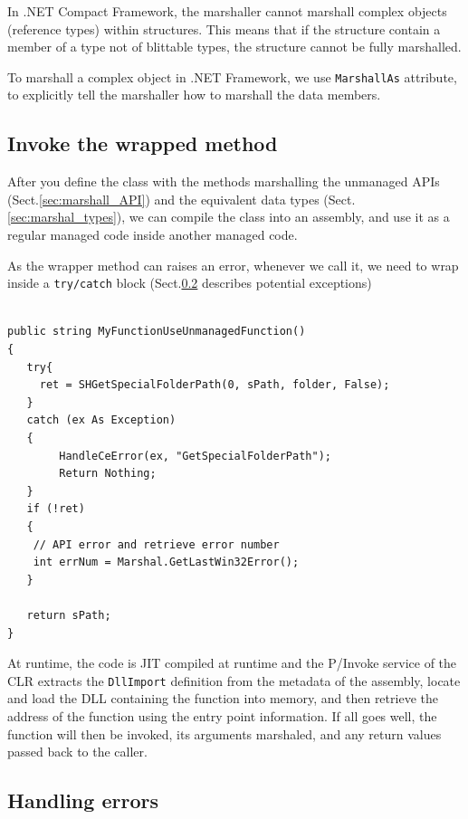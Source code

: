 \begin{mdframed}
In .NET Compact Framework, the marshaller cannot marshall complex objects
(reference types) within structures. This means that if the structure contain a
member of a type not of blittable types, the structure cannot be fully
marshalled. 
\end{mdframed}

To marshall a complex object in .NET Framework, we use \verb!MarshallAs!
attribute, to explicitly tell the marshaller how to marshall the data members. 

\subsection{Invoke the wrapped method}
\label{sec:invoke_wrapper-methods}

After you define the class with the methods marshalling the unmanaged APIs
(Sect.\ref{sec:marshall_API}) and the equivalent data types
(Sect.\ref{sec:marshal_types}), we can compile the class into an assembly, and
use it as a regular managed code inside another managed code.

As the wrapper method can raises an error, whenever we call it, we need to wrap
inside a \verb!try/catch! block (Sect.\ref{sec:marshall_handling-errors}
describes potential exceptions)
\begin{verbatim}

public string MyFunctionUseUnmanagedFunction()
{ 
   try{
     ret = SHGetSpecialFolderPath(0, sPath, folder, False);
   }
   catch (ex As Exception)
   {
        HandleCeError(ex, "GetSpecialFolderPath");
        Return Nothing;
   }   
   if (!ret)
   {
    // API error and retrieve error number
    int errNum = Marshal.GetLastWin32Error();
   }
   
   return sPath;
}      
\end{verbatim}

At runtime, the code is JIT compiled at runtime and the P/Invoke service of the
CLR extracts the \verb!DllImport! definition from the metadata of the assembly,
locate and load the DLL containing the function into memory, and then retrieve
the address of the function using the entry point information.
If all goes well, the function will then be invoked, its arguments marshaled,
and any return values passed back to the caller.

\subsection{Handling errors}
\label{sec:marshall_handling-errors}



